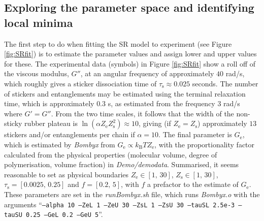 \documentclass[  superscriptaddress]{revtex4}
\newcommand{\kT}{k_\mathrm{B}T}
\begin{document}
\subsection{Exploring the parameter space and identifying local minima}
The first step to do when fitting the SR model to experiment (see Figure \ref{fig:SRfit}) is to estimate the parameter values and assign lower and upper values for these.
The experimental data (symbols) in Figure \ref{fig:SRfit} show a roll off of the viscous modulus, $G''$, at an angular frequency of approximately $40$ rad/s, which roughly gives a sticker dissociation time of $\tau_\mathrm{s} \approx 0.025$ seconds.
The number of stickers and entanglements may be estimated using the terminal relaxation time, which is approximately $0.3$ s, as estimated from the frequency $3$ rad/s where $G'=G''$.
From the two time scales, it follows that the width of the non-sticky rubber plateau is $\ln\left(\alpha Z_\mathrm{e}Z_\mathrm{s}^2\right) \approx 10$, giving (if $Z_\mathrm{e}=Z_\mathrm{s}$) approximately $13$ stickers and/or entanglements per chain if $\alpha=10$.
The final parameter is $G_\mathrm{e}$, which is estimated by \emph{Bombyx} from $G_\mathrm{e} \propto \kT Z_\mathrm{e}$, with the proportionality factor calculated from the physical properties (molecular volume, degree of polymerisation, volume fraction) in \emph{Demo/demodata}.
Summarised, it seems reasonable to set as physical boundaries  $Z_\mathrm{e} \in [1,\,30]$, $Z_\mathrm{s} \in [1,\,30]$, $\tau_\mathrm{s}=[0.0025,\, 0.25]$ and $f=[0.2,\,5]$, with $f$ a prefactor to the estimate of $G_\mathrm{e}$.
These parameters are set in the \emph{runBombyx.sh} file, which runs \emph{Bombyx.o} with the  arguments ``\texttt{--alpha 10 --ZeL 1 --ZeU 30 --ZsL 1 --ZsU 30 --tauSL 2.5e-3 --tauSU 0.25 --GeL 0.2 --GeU 5}''.


\end{document}
